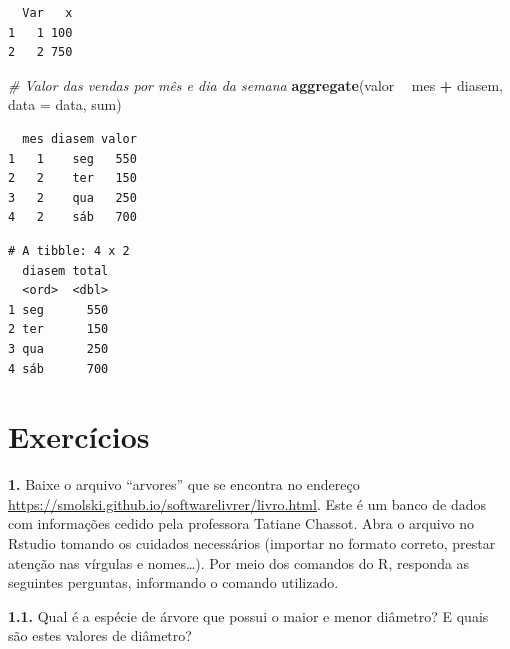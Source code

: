 \documentclass[12pt,brazil,oneside]{book}
\newenvironment{Shaded}{\begin{snugshade}}{\end{snugshade}}
\newcommand{\CommentTok}[1]{\textcolor[rgb]{0.56,0.35,0.01}{\textit{#1}}}
\newcommand{\DataTypeTok}[1]{\textcolor[rgb]{0.13,0.29,0.53}{#1}}
\newcommand{\KeywordTok}[1]{\textcolor[rgb]{0.13,0.29,0.53}{\textbf{#1}}}
\newcommand{\NormalTok}[1]{#1}
\newcommand{\OperatorTok}[1]{\textcolor[rgb]{0.81,0.36,0.00}{\textbf{#1}}}
\newcommand{\StringTok}[1]{\textcolor[rgb]{0.31,0.60,0.02}{#1}}
\begin{document}
\begin{verbatim}
  Var   x
1   1 100
2   2 750
\end{verbatim}

\begin{Shaded}
\begin{Highlighting}[]
\CommentTok{# Valor das vendas por mês e dia da semana }
\KeywordTok{aggregate}\NormalTok{(valor }\OperatorTok{~}\StringTok{ }\NormalTok{mes }\OperatorTok{+}\StringTok{ }\NormalTok{diasem, }\DataTypeTok{data =}\NormalTok{ data, sum)}
\end{Highlighting}
\end{Shaded}

\begin{verbatim}
  mes diasem valor
1   1    seg   550
2   2    ter   150
3   2    qua   250
4   2    sáb   700
\end{verbatim}

\begin{Shaded}
\end{Shaded}

\begin{verbatim}
# A tibble: 4 x 2
  diasem total
  <ord>  <dbl>
1 seg      550
2 ter      150
3 qua      250
4 sáb      700
\end{verbatim}

\hypertarget{exercicios}{%
\section{Exercícios}\label{exercicios}}

\textbf{1.} Baixe o arquivo ``arvores'' que se encontra no endereço \url{https://smolski.github.io/softwarelivrer/livro.html}. Este é um banco de dados com informações cedido pela professora Tatiane Chassot. Abra o arquivo no Rstudio tomando os cuidados necessários (importar no formato correto, prestar atenção nas vírgulas e nomes\ldots{}). Por meio dos comandos do R, responda as seguintes perguntas, informando o comando utilizado.

\textbf{1.1.} Qual é a espécie de árvore que possui o maior e menor diâmetro? E quais são estes valores de diâmetro?
\end{document}
